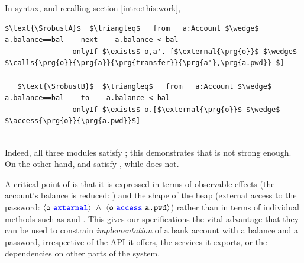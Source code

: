 In \Nec  syntax, and {recalling section \ref{intro:this:work}, }
 

%
%
%
%
%
%
\begin{lstlisting}[language = Chainmail, mathescape=true, frame=lines]
   $\text{\SrobustA}$  $\triangleq$   from   a:Account $\wedge$ a.balance==bal    next    a.balance < bal
                onlyIf $\exists$ o,a'. [$\external{\prg{o}}$ $\wedge$ $\calls{\prg{o}}{\prg{a}}{\prg{transfer}}{\prg{a'},\prg{a.pwd}} $]    
                
   $\text{\SrobustB}$  $\triangleq$   from   a:Account $\wedge$ a.balance==bal    to    a.balance < bal
                onlyIf $\exists$ o.[$\external{\prg{o}}$ $\wedge$ $\access{\prg{o}}{\prg{a.pwd}}$]    
           
\end{lstlisting}
%
%
% 

 {Indeed, all three modules   satisfy  \SrobustA;  this demonstrates that \SrobustA is not
strong enough. On the other hand, \ModA and \ModC satisfy \SrobustB, while \ModB does not.  }

A critical point of \SrobustB %
is that it is
expressed in terms of observable effects (the account's balance is
reduced: ) and the shape of the heap 
(external access to the password:
$\external{\prg{o}}\ \wedge\ \access{\prg{o}}{\prg{a.pwd}}$) 
rather than in terms of individual methods such as
 and .
This gives our specifications the
vital advantage that they can be used to constrain
\textit{implementation} of a bank account with a balance and a
password, irrespective of the API it
offers, the services it exports, or the dependencies on other parts of
the system.

